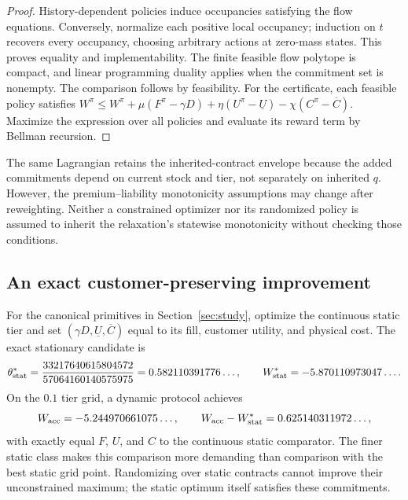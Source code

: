 \begin{proof}
History-dependent policies induce occupancies satisfying the flow equations. Conversely, normalize each positive local occupancy; induction on $t$ recovers every occupancy, choosing arbitrary actions at zero-mass states. This proves equality and implementability. The finite feasible flow polytope is compact, and linear programming duality applies when the commitment set is nonempty. The comparison follows by feasibility. For the certificate, each feasible policy satisfies
$W^\pi\leq W^\pi+\mu(F^\pi-\gamma D)+\eta(U^\pi-\underline U)-\chi(C^\pi-\overline C)$.
Maximize the expression over all policies and evaluate its reward term by Bellman recursion.\end{proof}
The same Lagrangian retains the inherited-contract envelope because the added commitments depend on current stock and tier, not separately on inherited $q$. However, the premium--liability monotonicity assumptions may change after reweighting. Neither a constrained optimizer nor its randomized policy is assumed to inherit the relaxation's statewise monotonicity without checking those conditions.

\subsection{An exact customer-preserving improvement}\label{sec:pareto}
For the canonical primitives in Section~\ref{sec:study}, optimize the continuous static tier and set $(\gamma D,\underline U,\overline C)$ equal to its fill, customer utility, and physical cost. The exact stationary candidate is
\[
 \theta^*_{\rm stat}=\frac{33217640615804572}{57064160140575975}
   =0.582110391776\ldots,
 \qquad W^*_{\rm stat}=-5.870110973047\ldots.
\]
On the $0.1$ tier grid, a dynamic protocol achieves
\begin{equation}\label{eq:paretogain}
 W_{\rm acc}=-5.244970661075\ldots,
 \qquad W_{\rm acc}-W^*_{\rm stat}=0.625140311972\ldots,
\end{equation}
with exactly equal $F$, $U$, and $C$ to the continuous static comparator. The finer static class makes this comparison more demanding than comparison with the best static grid point. Randomizing over static contracts cannot improve their unconstrained maximum; the static optimum itself satisfies these commitments.

